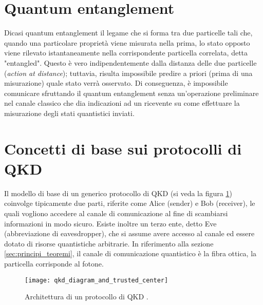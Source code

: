 \section{Quantum entanglement}
Dicasi quantum entanglement il legame che si forma tra due particelle tali che, quando una particolare proprietà viene misurata nella prima, lo stato opposto viene rilevato istantaneamente nella corrispondente particella correlata, detta "entangled". Questo è vero indipendentemente dalla distanza delle due particelle (\textit{action at distance}); tuttavia, risulta impossibile predire a priori (prima di una misurazione) quale stato verrà osservato. Di conseguenza, è impossibile comunicare sfruttando il quantum entanglement senza un'operazione preliminare nel canale classico che dia indicazioni ad un ricevente su come effettuare la misurazione degli stati quantistici inviati.  

\section{Concetti di base sui protocolli di QKD}
Il modello di base di un generico protocollo di QKD (si veda la figura \ref{fig:qkd_diagram_and_trusted_center}) coinvolge tipicamente due parti, riferite come Alice (sender) e Bob (receiver), le quali vogliono accedere al canale di comunicazione al fine di scambiarsi informazioni in modo sicuro. Esiste inoltre un terzo ente, detto Eve (abbreviazione di eavesdropper), che si assume avere accesso al canale ed essere dotato di risorse quantistiche arbitrarie. In riferimento alla sezione \ref{sec:principi_teoremi}, il canale di comunicazione quantistico è la fibra ottica, la particella corrisponde al fotone. 
\begin{figure}[h]
    \centering
    \texttt{[image: qkd\_diagram\_and\_trusted\_center]}
    \caption{Architettura di un protocollo di QKD \cite{security_qkdp}.}
    \label{fig:qkd_diagram_and_trusted_center}
\end{figure}

